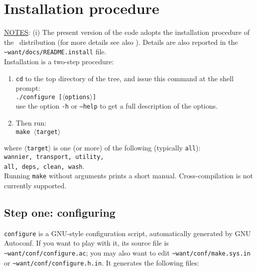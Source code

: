 
\thispagestyle{empty}
\section{Installation procedure}\label{section:install}

\noindent \underline {NOTES}: (i) The present version of the code
adopts the installation procedure of the \QUANTUMESPRESSO\ distribution (for more details see
also \QUANTUMESPRESSOURL). 
Details are also reported in the {\tt \~{}want/docs/README.install} file. \\

\noindent Installation is a two-step procedure:
%
%
\begin{enumerate}
\item \texttt{cd} to the top directory of the \WANT{} tree,
and issue this command at the shell
prompt:\\
{\tt ./configure [$\langle$options$\rangle$] } \\
use the option {\tt -h} or {\tt --help} to get a full description of the options.
\item Then run:\\
     {\tt make $\langle$target$\rangle$ }
\end{enumerate}
%
%
\noindent
where {\tt $\langle$target$\rangle$} is one (or more) of the following (typically {\tt all}):\\[10pt]
{\tt wannier, transport, utility, \\
all, deps, clean, wash}. \\[15pt] 

\noindent
Running {\tt make} without arguments prints a short manual.
Cross-compilation is not currently supported.


\subsection{Step one: configuring} {\tt configure} is a GNU-style configuration script,
automatically generated by GNU Autoconf. If you want to play
with it, its source file is {\tt \~{}want/conf/configure.ac}; you may also
want to edit {\tt \~{}want/conf/make.sys.in} or {\tt \~{}want/conf/configure.h.in}. 
It generates the following files: \\

